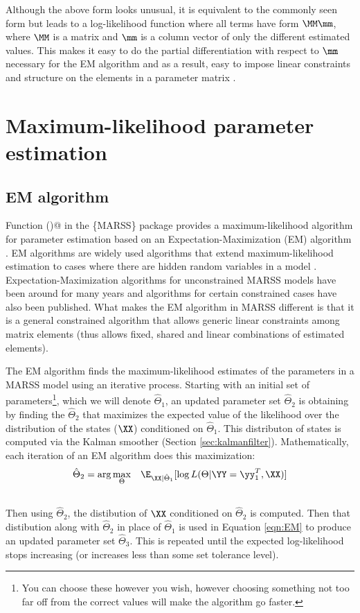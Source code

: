 Although the above form looks unusual, it is equivalent to the commonly seen form but leads to a log-likelihood function where all terms have form 
$\MM\mm$, where $\MM$ is a matrix and $\mm$ is a column vector of only the different estimated values.  This makes it easy to do the partial differentiation with respect
to $\mm$ necessary for the EM algorithm and as a result, easy to impose linear constraints and structure on the elements in a parameter matrix \citep{Holmes2010}.

\section{Maximum-likelihood parameter estimation}

\subsection{EM algorithm}

Function \verb@MARSSkem()@ in the \{MARSS\} package provides a maximum-likelihood algorithm for parameter estimation based on an Expectation-Maximization (EM) algorithm  \citep{Holmes2010}. EM algorithms are widely used algorithms that extend maximum-likelihood estimation to cases where there are hidden random variables in a model \citep{Dempsteretal1977, Harvey1989, HarveyShephard1993, McLachlanKrishnan2008}.   Expectation-Maximization algorithms for unconstrained MARSS models have been around for many years and algorithms for certain constrained cases have also been published.  What makes the EM algorithm in MARSS different is that it is a general constrained algorithm that allows generic linear constraints among matrix elements (thus allows fixed, shared and linear combinations of estimated elements). 

The EM algorithm finds the maximum-likelihood estimates of the parameters in a MARSS model using an iterative process.  Starting with an initial set of parameters\footnote{You can choose these however you wish, however choosing something not too far off from the correct values will make the algorithm go faster.}, which we will denote $\hat{\Theta}_1$, an updated parameter set $\hat{\Theta}_2$ is obtaining by finding the $\hat{\Theta}_2$ that maximizes the expected value of the likelihood over the distribution of the states ($\XX$) conditioned on $\hat{\Theta}_1$. This distributon of states is computed via the Kalman smoother (Section \ref{sec:kalmanfilter}).  Mathematically, each iteration of an EM algorithm does this maximization:
\begin{align}\label{eqn:EM}
	\hat{\Theta}_2 &= \arg\underset{\Theta}{\max} \quad \E_{\XX|\hat{\Theta}_1}[\log L(\Theta |\YY=\yy_1^T,\XX)]\\
\nonumber
\end{align}
Then using $\hat{\Theta}_2$, the distibution of $\XX$ conditioned on $\hat{\Theta}_2$ is computed.  Then that distibution along with $\hat{\Theta}_2$ in place of $\hat{\Theta}_1$ is used in Equation \ref{eqn:EM} to produce an updated parameter set $\hat{\Theta}_3$.  This is repeated until the expected log-likelihood stops increasing (or increases less than some set tolerance level).

